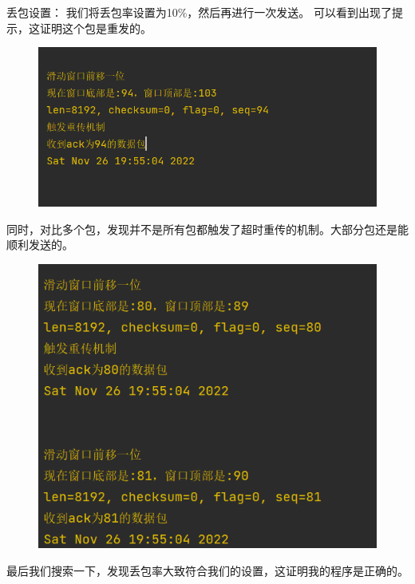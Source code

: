 \documentclass[UTF8,a4paper,10pt]{ctexart}
\begin{document}
丢包设置：
我们将丢包率设置为10\%，然后再进行一次发送。
可以看到出现了提示，这证明这个包是重发的。
\begin{figure}[H]
    \centering
    \includegraphics[scale=0.6]{G网4.png}
    \label{fig:9}
\end{figure}
同时，对比多个包，发现并不是所有包都触发了超时重传的机制。大部分包还是能顺利发送的。
\begin{figure}[H]
    \centering
    \includegraphics[scale=0.6]{G网5.png}
    \label{fig:10}
\end{figure}
最后我们搜索一下，发现丢包率大致符合我们的设置，这证明我的程序是正确的。
\end{document}
